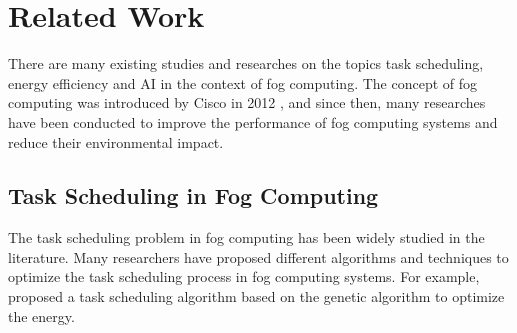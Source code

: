 \chapter*{Related Work}
\label{chap:relatedwork}

There are many existing studies and researches on the topics task scheduling, energy efficiency and AI in the context
of fog computing. The concept of fog computing was introduced by Cisco in 2012 \cite{bonomi_et_al_2012}, and since
then, many researches have been conducted to improve the performance of fog computing systems and reduce their
environmental impact.

\section*{Task Scheduling in Fog Computing}

The task scheduling problem in fog computing has been widely studied in the literature. Many researchers have proposed
different algorithms and techniques to optimize the task scheduling process in fog computing systems. For example,
\cite{canali_lancellotti_2019} proposed a task scheduling algorithm based on the genetic algorithm to optimize the energy.